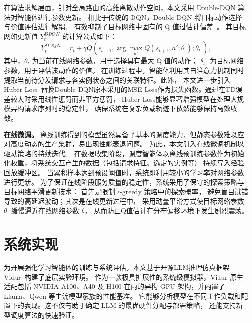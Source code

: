 在算法求解层面，针对全局路由的高维离散动作空间，本文采用 Double-DQN 算法对智能体进行参数更新。
相比于传统的 DQN，Double-DQN 将目标动作选择与价值评估进行解耦，
有效抑制了目标网络中固有的 Q 值过估计偏差~\cite{van2016deep}。
其目标网络更新值 $Y_t^{DDQN}$ 的计算公式如下：
\begin{equation}\label{eq:ddqn-target}
  Y_t^{DDQN} = r_t + \gamma Q\left(s_{t+1}, \arg\max_{a'} Q\left(s_{t+1}, a'; \theta_t\right); \theta_t^-\right),
\end{equation}
\noindent 其中，$\theta_t$ 为当前在线网络参数，用于选择具有最大 Q 值的动作；
$\theta_t^-$ 为目标网络参数，用于评估该动作的价值。
在训练过程中，智能体利用其自注意力机制同时提取当前待分发请求与各实例状态之间的关联特征。此外，
本文进一步引入Huber Loss~\cite{huber1992robust}替换Double DQN原本采用的MSE Loss作为损失函数。通过在TD误差较大时采用线性惩罚而非平方惩罚，
Huber Loss能够显著增强模型在处理大规模异构请求序列时的稳定性，
确保系统在复杂负载轨迹下依然能够保持高效收敛。

\textbf{在线微调。}
离线训练得到的模型虽然具备了基本的调度能力，但静态参数难以应对高度动态的生产集群，易出现性能衰退问题。
为此，本文引入在线微调机制以驱动策略的持续迭代。
在数据收集阶段，调度智能体以离线预训练参数作为初始化权重，将系统交互产生的数据（包括请求特征、选定的实例等）
持续写入经验回放缓冲区。
当累积样本达到预设阈值时，系统即利用较小的学习率对网络参数进行更新。
为了保证在线阶段服务质量的稳定性，系统采用了保守的探索策略与目标网络平滑更新技术：
首先是限制 $\epsilon$-greedy 策略中的探索概率，
避免盲目试错导致的高延迟波动；其次是在线更新过程中，
采用动量平滑方式使目标网络参数 $\theta^-$缓慢逼近在线网络参数 $\theta$，
从而防止Q值估计在分布偏移环境下发生剧烈震荡。

\section{系统实现}\label{sec:implementation}

为开展强化学习智能体的训练与系统评估，本文基于开源LLM推理仿真框架Vidur~\cite{agrawal2024vidur}构建了底层实验环境。
作为一款极具扩展性的系统级模拟器，Vidur 原生适配包括 NVIDIA A100、A40 及 H100 在内的异构 GPU 架构，并内置了 Llama、Qwen 等主流模型家族的性能基准。
它能够分析模型在不同工作负载和配置下的表现。这不仅有助于确定 LLM 的最优硬件分配与部署策略，
还能支持新型调度算法的快速验证。

